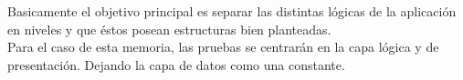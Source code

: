 Basicamente el objetivo principal es separar las distintas lógicas de la aplicación en niveles y que
éstos posean estructuras bien planteadas.\\

Para el caso de esta memoria, las pruebas se centrarán en la capa lógica y de presentación. Dejando
la capa de datos como una constante.




\newpage